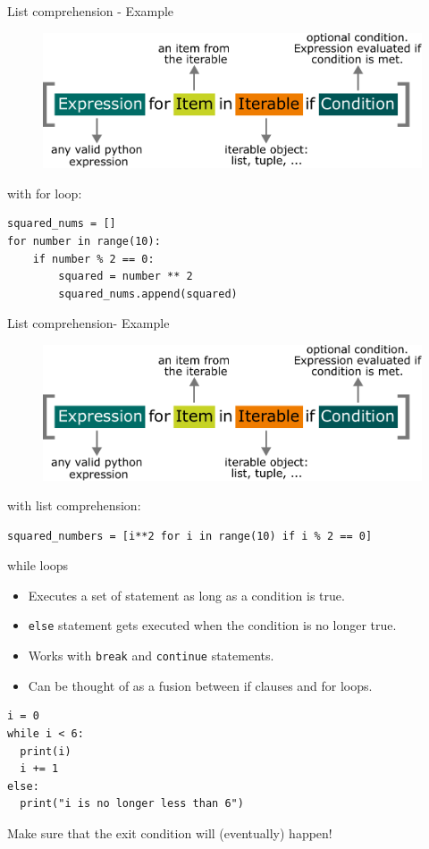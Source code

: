 \documentclass[compress%
,aspectratio=169%
]{beamer}
\newcommand{\code}{\lstinline}
\begin{document}
\begin{frame}[fragile]{List comprehension - Example}
\begin{figure}
    \centering
    \includegraphics[width=0.6\linewidth]{img/list_comprehension.pdf}
\end{figure}

with for loop:
\begin{lstlisting}
squared_nums = []
for number in range(10):
    if number % 2 == 0:
        squared = number ** 2
        squared_nums.append(squared)
\end{lstlisting}
\end{frame}

\begin{frame}[fragile]{List comprehension- Example}
\begin{figure}
    \centering
    \includegraphics[width=0.6\linewidth]{img/list_comprehension.pdf}
\end{figure}

with list comprehension:
\begin{lstlisting}
squared_numbers = [i**2 for i in range(10) if i % 2 == 0]
\end{lstlisting}
\end{frame}


\begin{frame}[fragile]{while loops}
\begin{itemize}
    \item Executes a set of statement as long as a condition is true.
    \item \code|else| statement gets executed when the condition is no longer true.
    \item Works with \code|break| and \code|continue| statements.
    \item Can be thought of as a fusion between if clauses and for loops.
\end{itemize}
\begin{lstlisting}
i = 0
while i < 6:
  print(i)
  i += 1
else:
  print("i is no longer less than 6")
\end{lstlisting}
\alert{Make sure that the exit condition will (eventually) happen!}
\end{frame}
\end{document}
